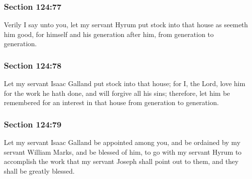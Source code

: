 	\subsubsection{Section 124:77} %
		\label{DC124-77}

		Verily I say unto you, let my servant Hyrum put stock into that house as seemeth him good, for himself and his generation after him, from generation to generation.


	\subsubsection{Section 124:78} %
		\label{DC124-78}

		Let my servant Isaac Galland put stock into that house; for I, the Lord, love him for the work he hath done, and will forgive all his sins; therefore, let him be remembered for an interest in that house from generation to generation.


	\subsubsection{Section 124:79} %
		\label{DC124-79}

		Let my servant Isaac Galland be appointed among you, and be ordained by my servant William Marks, and be blessed of him, to go with my servant Hyrum to accomplish the work that my servant Joseph shall point out to them, and they shall be greatly blessed.



